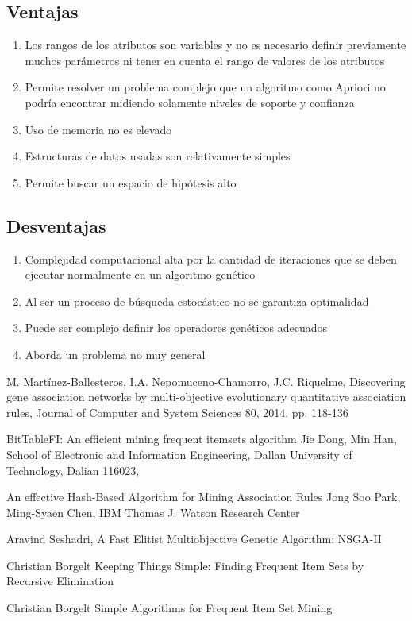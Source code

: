 \documentclass[12pt,spanish]{article}
\begin{document}
\subsection{Ventajas}
\begin{enumerate}
\item Los rangos de los atributos son variables y no es necesario definir previamente muchos par\'ametros ni tener en cuenta el rango de valores de los atributos
\item Permite resolver un problema complejo que un algoritmo como Apriori no podr\'ia encontrar midiendo solamente niveles de soporte y confianza
\item Uso de memoria no es elevado
\item Estructuras de datos usadas son relativamente simples
\item Permite buscar un espacio de hip\'otesis alto
\end{enumerate}

\subsection{Desventajas}
\begin{enumerate}
\item Complejidad computacional alta por la cantidad de iteraciones que se deben ejecutar normalmente en un algoritmo gen\'etico
\item Al ser un proceso de b\'usqueda estoc\'astico no se garantiza optimalidad
\item Puede ser complejo definir los operadores gen\'eticos adecuados
\item Aborda un problema no muy general
\end{enumerate}

\begin{thebibliography}{9}

	M. Martínez-Ballesteros, I.A. Nepomuceno-Chamorro, J.C. Riquelme,
	Discovering gene association networks by multi-objective evolutionary quantitative association rules,
	Journal of Computer and System Sciences 80, 2014,
	pp. 118-136

	BitTableFI: An efficient mining frequent itemsets algorithm
	Jie Dong, Min Han,
	School of Electronic and Information Engineering, Dallan University of Technology, Dalian 116023,

	An effective Hash-Based Algorithm for Mining Association Rules
	Jong Soo Park, Ming-Syaen Chen,
	IBM Thomas J. Watson Research Center

	Aravind Seshadri,
	A Fast Elitist Multiobjective Genetic Algorithm: NSGA-II

	Christian Borgelt
	Keeping Things Simple: Finding Frequent Item Sets by Recursive Elimination

	Christian Borgelt
	Simple Algorithms for Frequent Item Set Mining

\end{thebibliography}
\end{document}
